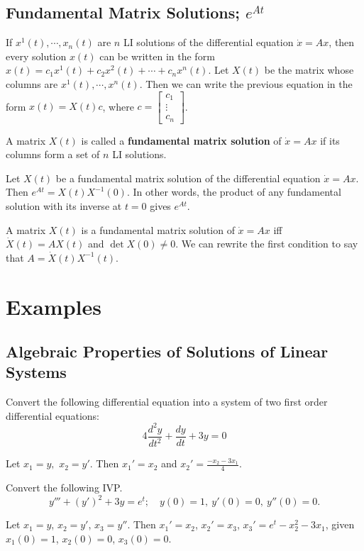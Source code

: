 \subsection{Fundamental Matrix Solutions; $e^{At}$}
If $x^1(t),\cdots ,x_n (t)$ are $n$ LI solutions of the differential equation $\dot x=Ax$, then every solution $x(t)$ can be written in the form $x(t)=c_1x^1(t)+c_2x^2(t)+\cdots +c_n x^n (t)$. Let $X(t)$ be the matrix whose columns are $x^1(t),\cdots ,x^n (t)$. Then we can write the previous equation in the form $x(t)=X(t)c$, where $c=
\begin{bmatrix}
    c_1\\ \vdots \\ c_n 
\end{bmatrix}$.
\begin{definition}
    A matrix $X(t)$ is called a \textbf{fundamental matrix solution} of $\dot x=Ax$ if its columns form a set of $n$ LI solutions.
\end{definition}
\begin{theorem}
    Let $X(t)$ be a fundamental matrix solution of the differential equation $\dot x=Ax$. Then $e^{At}=X(t)X^{-1}(0)$. In other words, the product of any fundamental solution with its inverse at $t=0$ gives $e^{At}$.
\end{theorem}
\begin{lemma}
    A matrix $X(t)$ is a fundamental matrix solution of $\dot x=Ax$ iff $\dot X(t)=AX(t)$ and $\det X(0)\neq 0$. We can rewrite the first condition to say that $A=\dot X(t)X^{-1}(t)$.
\end{lemma}

\newpage
\section{Examples}

\subsection{Algebraic Properties of Solutions of Linear Systems}
\begin{prob}
    Convert the following differential equation into a system of two first order differential equations: \[
    4 \frac{d^2y}{dt^2}+\frac{dy}{dt}+3y=0
    \] 
\end{prob}
\begin{solution}
    Let $x_1=y,$ $x_2=y'$. Then $x_1'=x_2$ and $x_2'=\frac{-x_2-3x_1}{4}$.
\end{solution}
\begin{prob}
    Convert the following IVP.
    \[
        y'''+(y')^2+3y=e^t; \quad y(0)=1, \ y'(0)=0, \ y''(0)=0.
    \] 
\end{prob}
\begin{solution}
    Let $x_1=y$, $x_2=y'$, $x_3=y''$. Then $x_1'=x_2$, $x_2'=x_3$, $x_3'=e^t-x_2^2-3x_1$, given $x_1(0)=1$, $x_2(0)=0$, $x_3(0)=0$.
\end{solution}

